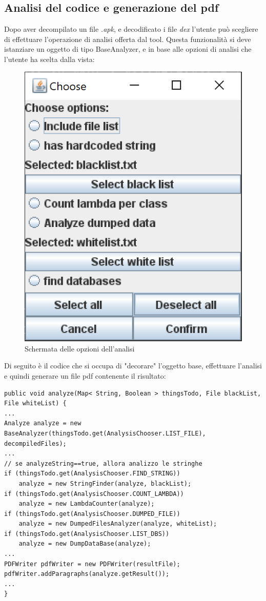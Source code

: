 \subsection{Analisi del codice e generazione del pdf}\label{subsec:analisi-del-codice-e-generazione-del-pdf}
Dopo aver decompilato un file \textit{.apk}, e decodificato i file \textit{dex} l'utente può scegliere di effettuare l'operazione di analisi offerta dal tool.
Questa funzionalità si deve istanziare un oggetto di tipo BaseAnalyzer, e in base alle opzioni di analisi che l'utente ha scelta dalla vista:
\begin{figure}[H]
    \centering
    \includegraphics{./immagini/tool/analysis_chooser.png}
    \caption{Schermata delle opzioni dell'analisi}\label{fig:analysis_chooser}
\end{figure}
Di seguito è il codice che si occupa di "decorare" l'oggetto base, effettuare l'analisi e quindi generare un file pdf contenente il risultato:

\begin{lstlisting}[caption={Decorator},label={lst:analyze}]
public void analyze(Map< String, Boolean > thingsTodo, File blackList, File whiteList) {
...
Analyze analyze = new BaseAnalyzer(thingsTodo.get(AnalysisChooser.LIST_FILE), decompiledFiles);
...
// se analyzeString==true, allora analizzo le stringhe
if (thingsTodo.get(AnalysisChooser.FIND_STRING))
    analyze = new StringFinder(analyze, blackList);
if (thingsTodo.get(AnalysisChooser.COUNT_LAMBDA))
    analyze = new LambdaCounter(analyze);
if (thingsTodo.get(AnalysisChooser.DUMPED_FILE))
    analyze = new DumpedFilesAnalyzer(analyze, whiteList);
if (thingsTodo.get(AnalysisChooser.LIST_DBS))
    analyze = new DumpDataBase(analyze);
...
PDFWriter pdfWriter = new PDFWriter(resultFile);
pdfWriter.addParagraphs(analyze.getResult());
...
}
\end{lstlisting}

